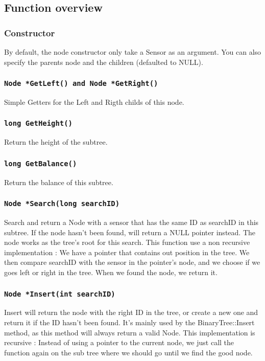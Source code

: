 \documentclass[10pt]{article}
\begin{document}
\subsection{Function overview}
\subsubsection*{Constructor}
By default, the node constructor only take a Sensor as an argument. You can also specify the parents node and the children (defaulted to NULL).
\subsubsection*{\tt Node *GetLeft()  and Node *GetRight() }
Simple Getters for the Left and Rigth childs of this node.

\subsubsection*{\tt long GetHeight()}
Return the height of the subtree.

\subsubsection*{\tt long GetBalance()}
Return the balance of this subtree.

\subsubsection*{\tt Node *Search(long searchID)}
Search and return a Node with a sensor that has the same ID as searchID in this subtree. If the node hasn't been found, will return a NULL pointer instead.
The node works as the tree's root for this search. This function use a non recursive implementation : We have a pointer that contains out position in the tree. We then compare searchID with the sensor in the pointer's node, and we choose if we goes left or right in the tree. When we found the node, we return it.

\subsubsection*{\tt Node *Insert(int searchID)}
Insert will return the node with the right ID in the tree, or create a new one and return it if the ID hasn't been found. It's mainly used by the BinaryTree::Insert method, as this method will always return a valid Node.
This implementation is recursive : Instead of using a pointer to the current node, we just call the function again on the sub tree where we should go until we find the good node.
\end{document}
